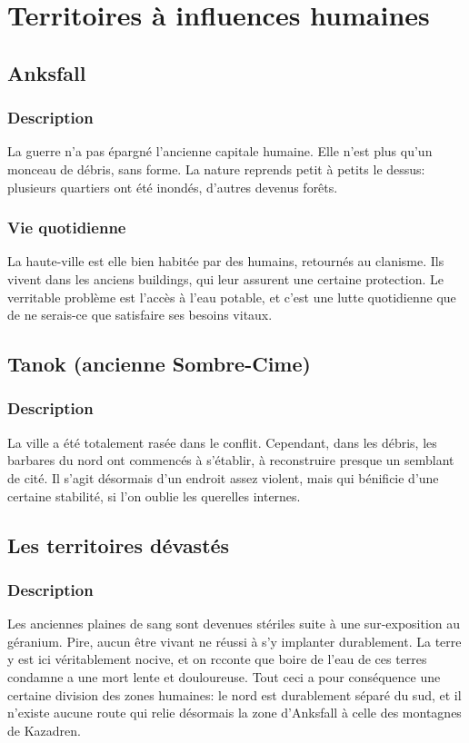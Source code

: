 \section{Territoires à influences humaines}
\subsection{Anksfall}
\subsubsection{Description}
La guerre n'a pas épargné l'ancienne capitale humaine. Elle n'est plus qu'un monceau de débris, sans forme. La nature reprends petit à petits le dessus: plusieurs quartiers ont été inondés, d'autres devenus forêts.
\subsubsection{Vie quotidienne}
La haute-ville est elle bien habitée par des humains, retournés au clanisme. Ils vivent dans les anciens buildings, qui leur assurent une certaine protection. Le verritable problème est l'accès à l'eau potable, et c'est une lutte quotidienne que de ne serais-ce que satisfaire ses besoins vitaux.

\subsection{Tanok (ancienne Sombre-Cime)}
\subsubsection{Description}
La ville a été totalement rasée dans le conflit. Cependant, dans les débris, les barbares du nord ont commencés à s'établir, à reconstruire presque un semblant de cité. Il s'agit désormais d'un endroit assez violent, mais qui bénificie d'une certaine stabilité, si l'on oublie les querelles internes.

\subsection{Les territoires dévastés}
\subsubsection{Description}
Les anciennes plaines de sang sont devenues stériles suite à une sur-exposition au géranium. Pire, aucun être vivant ne réussi à s'y implanter durablement. La terre y est ici véritablement nocive, et on rcconte que boire de l'eau de ces terres condamne a une mort lente et douloureuse.
\newline
Tout ceci a pour conséquence une certaine division des zones humaines: le nord est durablement séparé du sud, et il n'existe aucune route qui relie désormais la zone d'Anksfall à celle des montagnes de Kazadren.


